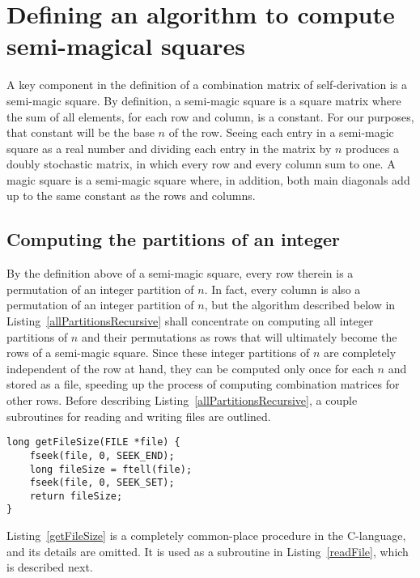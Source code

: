 \section{Defining an algorithm to compute semi-magical squares}

A key component in the definition of a combination matrix of self-derivation is a semi-magic square. By definition, a semi-magic square is a square matrix where the sum of all elements, for each row and column, is a constant. For our purposes, that constant will be the base $n$ of the row. Seeing each entry in a semi-magic square as a real number and dividing each entry in the matrix by $n$ produces a doubly stochastic matrix, in which every row and every column sum to one. A magic square is a semi-magic square where, in addition, both main diagonals add up to the same constant as the rows and columns.

\subsection{Computing the partitions of an integer}

By the definition above of a semi-magic square, every row therein is a permutation of an integer partition of $n$. In fact, every column is also a permutation of an integer partition of $n$, but the algorithm described below in Listing~\ref{allPartitionsRecursive} shall concentrate on computing all integer partitions of $n$ and their permutations as rows that will ultimately become the rows of a semi-magic square. Since these integer partitions of $n$ are completely independent of the row at hand, they can be computed only once for each $n$ and stored as a file, speeding up the process of computing combination matrices for other rows. Before describing Listing~\ref{allPartitionsRecursive}, a couple subroutines for reading and writing files are outlined.

\begin{lstlisting}[caption={Retrieving the size of a file.},label={getFileSize}]
long getFileSize(FILE *file) {
    fseek(file, 0, SEEK_END);
    long fileSize = ftell(file);
    fseek(file, 0, SEEK_SET);
    return fileSize;
}
\end{lstlisting}

Listing~\ref{getFileSize} is a completely common-place procedure in the C-language, and its details are omitted. It is used as a subroutine in Listing~\ref{readFile}, which is described next.

